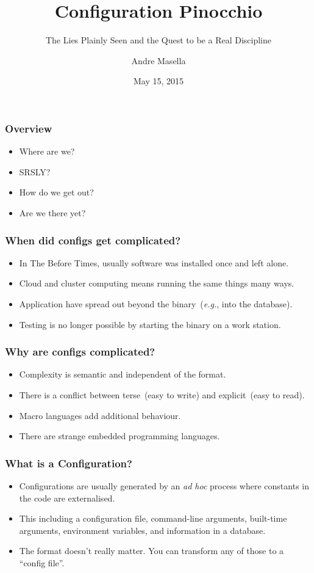 \documentclass{beamer}
\title{Configuration Pinocchio}
\subtitle{The Lies Plainly Seen and the Quest to be a Real Discipline}
\author{Andre Masella}
\date{May 15, 2015}
\begin{document}
\begin{frame}\maketitle \end{frame}

\begin{frame}\frametitle{Overview}
\begin{itemize}
\item Where are we?
\item SRSLY?
\item How do we get out?
\item Are we there yet?
\end{itemize}
\end{frame}

\begin{frame}\frametitle{When did configs get complicated?}
\begin{itemize}
\item In The Before Times, usually software was installed once and left alone.
\item Cloud and cluster computing means running the same things many ways.
\item Application have spread out beyond the binary~(\emph{e.g.}, into the database).
\item Testing is no longer possible by starting the binary on a work station.
\end{itemize}
\end{frame}

\begin{frame}\frametitle{Why are configs complicated?}
\begin{itemize}
\item Complexity is semantic and independent of the format.
\item There is a conflict between terse~(easy to write) and explicit~(easy to read).
\item Macro languages add additional behaviour.
\item There are strange embedded programming languages.
\end{itemize}
\end{frame}

\begin{frame}\frametitle{What is a Configuration?}
\begin{itemize}
\item Configurations are usually generated by an \emph{ad hoc} process where constants in the code are externalised.
\item This including a configuration file, command-line arguments, built-time arguments, environment variables, and information in a database.
\item The format doesn't really matter. You can transform any of those to a ``config file''.
\end{itemize}
\end{frame}
\end{document}
